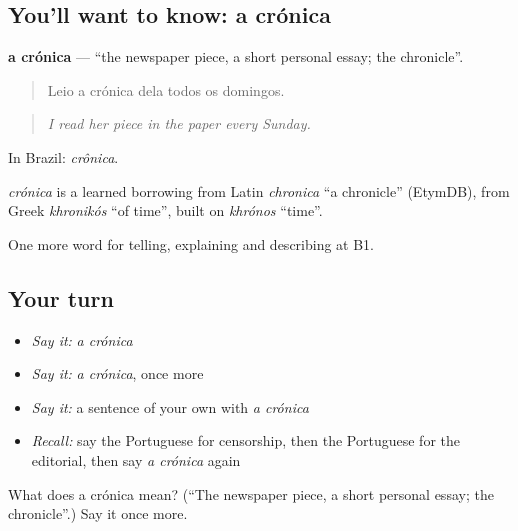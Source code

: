 \subsection*{You'll want to know: a crónica}
\textbf{a crónica} — \textquotedblleft{}the newspaper piece, a short personal essay; the chronicle\textquotedblright{}.

\begin{quote}
Leio a crónica dela todos os domingos.
\end{quote}

\begin{quote}
\emph{I read her piece in the paper every Sunday.}
\end{quote}

In Brazil: \emph{crônica}.

\begin{cousinweb}
\emph{crónica} is a learned borrowing from Latin \emph{chronica} \textquotedblleft{}a chronicle\textquotedblright{} (EtymDB), from Greek \emph{khronikós} \textquotedblleft{}of time\textquotedblright{}, built on \emph{khrónos} \textquotedblleft{}time\textquotedblright{}.
\end{cousinweb}

\begin{grammarlens}[title={What you've built}]
One more word for telling, explaining and describing at B1.
\end{grammarlens}

\subsection*{Your turn}
\begin{itemize}
\raggedright
  \item \emph{Say it:} \emph{a crónica}
  \item \emph{Say it:} \emph{a crónica}, once more
  \item \emph{Say it:} a sentence of your own with \emph{a crónica}
  \item \emph{Recall:} say the Portuguese for censorship, then the Portuguese for the editorial, then say \emph{a crónica} again
\end{itemize}

\begin{tcolorbox}[breakable,colback=teal!4,colframe=teal!35!black,title={Before you move on}]
What does a crónica mean? (\textquotedblleft{}The newspaper piece, a short personal essay; the chronicle\textquotedblright{}.) Say it once more.
\end{tcolorbox}
